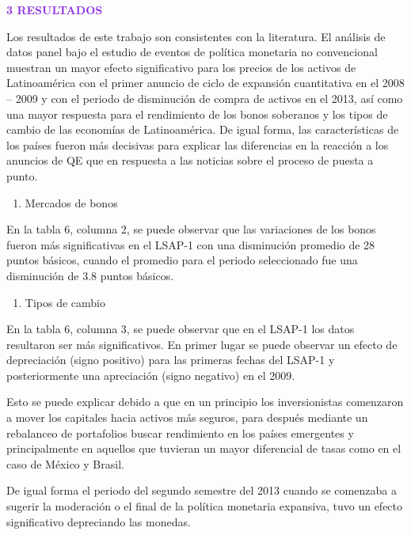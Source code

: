 \documentclass[
  9.5pt,
]{article}
\providecommand{\tightlist}{%
  \setlength{\itemsep}{0pt}\setlength{\parskip}{0pt}}
\begin{document}
\textbf{\textcolor{BlueViolet}{3   RESULTADOS}}

Los resultados de este trabajo son consistentes con la literatura. El
análisis de datos panel bajo el estudio de eventos de política monetaria
no convencional muestran un mayor efecto significativo para los precios
de los activos de Latinoamérica con el primer anuncio de ciclo de
expansión cuantitativa en el 2008 -- 2009 y con el periodo de
disminución de compra de activos en el 2013, así como una mayor
respuesta para el rendimiento de los bonos soberanos y los tipos de
cambio de las economías de Latinoamérica. De igual forma, las
características de los países fueron más decisivas para explicar las
diferencias en la reacción a los anuncios de QE que en respuesta a las
noticias sobre el proceso de puesta a punto.

\begin{enumerate}
\def\labelenumi{\arabic{enumi}.}
\tightlist
\item
  Mercados de bonos
\end{enumerate}

En la tabla 6, columna 2, se puede observar que las variaciones de los
bonos fueron más significativas en el LSAP-1 con una disminución
promedio de 28 puntos básicos, cuando el promedio para el periodo
seleccionado fue una disminución de 3.8 puntos básicos.

\begin{enumerate}
\def\labelenumi{\arabic{enumi}.}
\setcounter{enumi}{1}
\tightlist
\item
  Tipos de cambio
\end{enumerate}

En la tabla 6, columna 3, se puede observar que en el LSAP-1 los datos
resultaron ser más significativos. En primer lugar se puede observar un
efecto de depreciación (signo positivo) para las primeras fechas del
LSAP-1 y posteriormente una apreciación (signo negativo) en el 2009.

Esto se puede explicar debido a que en un principio los inversionistas
comenzaron a mover los capitales hacia activos más seguros, para después
mediante un rebalanceo de portafolios buscar rendimiento en los países
emergentes y principalmente en aquellos que tuvieran un mayor
diferencial de tasas como en el caso de México y Brasil.

De igual forma el periodo del segundo semestre del 2013 cuando se
comenzaba a sugerir la moderación o el final de la política monetaria
expansiva, tuvo un efecto significativo depreciando las monedas.
\end{document}
